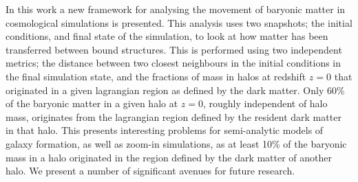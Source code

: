 In this work a new framework for analysing the movement of baryonic matter
in cosmological simulations is presented. This analysis uses two snapshots;
the initial conditions, and final state of the simulation, to look at how
matter has been transferred between bound structures. This is performed using
two independent metrics; the distance between two closest neighbours in the
initial conditions in the final simulation state, and the fractions of mass
in halos at redshift $z=0$ that originated in a given lagrangian region as
defined by the dark matter. Only 60\% of the baryonic matter in a given halo
at $z=0$, roughly independent of halo mass, originates from the lagrangian
region defined by the resident dark matter in that halo. This presents
interesting problems for semi-analytic models of galaxy formation, as well
as zoom-in simulations, as at least 10\% of the baryonic mass in a halo
originated in the region defined by the dark matter of another halo. We present
a number of significant avenues for future research.
